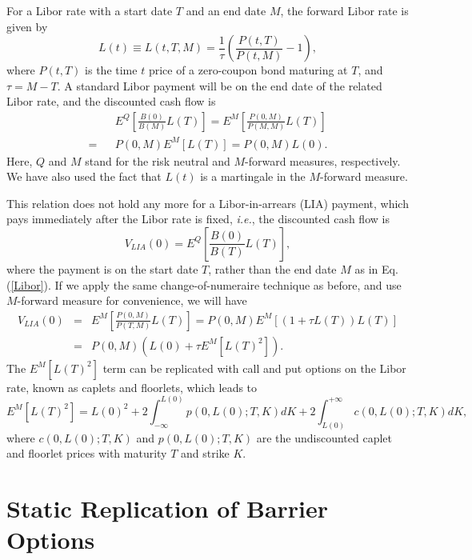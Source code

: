\documentclass[12pt]{article}
\begin{document}
    For a Libor rate with a start date $T$ and an end date $M$, the forward Libor rate is given by
    \begin{equation}
      L(t)\equiv L(t,T,M)=\frac{1}{\tau}\left(\frac{P(t,T)}{P(t,M)}-1\right),
    \end{equation}
    where $P(t,T)$ is the time $t$ price of a zero-coupon bond maturing at $T$, and $\tau=M-T$. A standard Libor payment
    will be on the end date of the related Libor rate, and the discounted cash flow is
    \begin{eqnarray}
       &&E^Q\left[\frac{B(0)}{B(M)}L(T)\right]=E^M\left[\frac{P(0,M)}{P(M,M)}L(T)\right]\nonumber\\
      =&&P(0,M)E^M\left[L(T)\right]=P(0,M)L(0).
      \label{Libor}
    \end{eqnarray}
    Here, $Q$ and $M$ stand for the risk neutral and $M$-forward measures, respectively. We have also used the fact that $L(t)$
    is a martingale in the $M$-forward measure.

    This relation does not hold any more for a Libor-in-arrears (LIA) payment, which pays immediately after the Libor rate
    is fixed, {\it i.e.}, the discounted cash flow is
    \begin{equation}
      V_{LIA}(0)=E^Q\left[\frac{B(0)}{B(T)}L(T)\right],
    \end{equation}
    where the payment is on the start date $T$, rather than the end date $M$ as in Eq. (\ref{Libor}). If we apply the same
    change-of-numeraire technique as before, and use $M$-forward measure for convenience, we will have
    \begin{eqnarray}
      V_{LIA}(0)&=&E^M\left[\frac{P(0,M)}{P(T,M)}L(T)\right]=P(0,M)E^M\left[\left(1+\tau L(T)\right)L(T)\right]\nonumber\\
                &=&P(0,M)\left(L(0)+\tau E^M\left[L(T)^2\right]\right).
    \end{eqnarray}
    The $E^M\left[L(T)^2\right]$ term can be replicated with call and put options on the Libor rate, known as caplets and floorlets,
    which leads to
    \begin{equation}
      E^M\left[L(T)^2\right] = L(0)^2 + 2\int_{-\infty}^{L(0)}p(0,L(0);T,K)dK + 2\int_{L(0)}^{+\infty}c(0,L(0);T,K)dK,
    \end{equation}
    where $c(0,L(0);T,K)$ and $p(0,L(0);T,K)$ are the undiscounted caplet and floorlet prices with maturity $T$ and strike $K$.


\section{Static Replication of Barrier Options}
\end{document}
